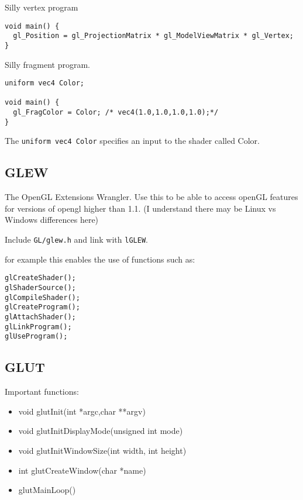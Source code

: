 \documentclass[12pt]{article}
\begin{document}
Silly vertex program  
\begin{small}
\begin{verbatim} 
void main() {		
  gl_Position = gl_ProjectionMatrix * gl_ModelViewMatrix * gl_Vertex;
}
\end{verbatim}
\end{small}               
 
Silly fragment program.     
\begin{small}
\begin{verbatim} 
uniform vec4 Color; 

void main() {
  gl_FragColor = Color; /* vec4(1.0,1.0,1.0,1.0);*/
}

\end{verbatim}
\end{small}    
The {\tt uniform vec4 Color} specifies an input to the shader called Color.

\subsection{GLEW} 

The OpenGL Extensions Wrangler. Use this to be able to access  
openGL features for versions of opengl higher than 1.1. 
(I understand there may be Linux vs Windows differences here)

Include {\tt GL/glew.h} and link with {\tt lGLEW}.

for example this enables the use of functions such as: 

\begin{small} 
\begin{verbatim}
glCreateShader();
glShaderSource();
glCompileShader();
glCreateProgram();
glAttachShader();
glLinkProgram();
glUseProgram();
\end{verbatim}
\end{small}

\subsection{GLUT}

Important functions: 
\begin{itemize}
\item{void glutInit(int *argc,char **argv)} 
\item{void glutInitDisplayMode(unsigned int mode)}
\item{void glutInitWindowSize(int width, int height)}
\item{int glutCreateWindow(char *name})
\item{glutMainLoop()}                                                        
\end{itemize}
\end{document}
